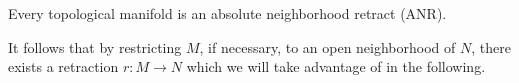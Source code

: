 \begin{myparagraph}
    Every topological manifold is an absolute neighborhood retract (ANR).
    
    It follows that by restricting $M$, if necessary, to an open neighborhood of $N$,
    there exists a retraction $r: M \to N$ which we will take advantage of in the following.
\end{myparagraph}